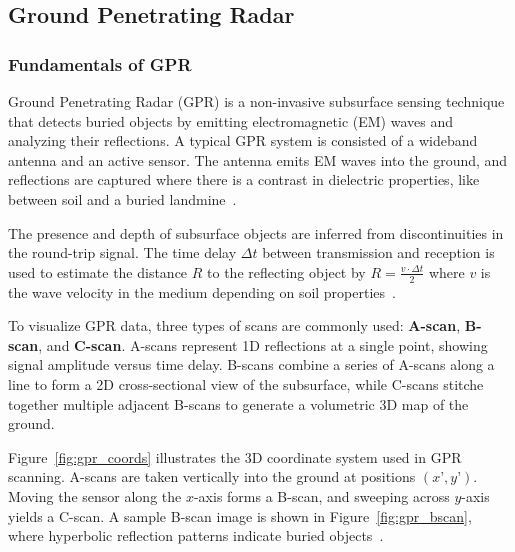 \subsection{Ground Penetrating Radar}

\subsubsection{Fundamentals of GPR}

Ground Penetrating Radar (GPR) is a non-invasive subsurface sensing technique that detects buried objects by emitting electromagnetic (EM) waves and analyzing their reflections. A typical GPR system is consisted of a wideband antenna and an active sensor. The antenna emits EM waves into the ground, and reflections are captured where there is a contrast in dielectric properties, like between soil and a buried landmine~\cite{paik2002image}.

The presence and depth of subsurface objects are inferred from discontinuities in the round-trip signal. The time delay $\Delta t$ between transmission and reception is used to estimate the distance $R$ to the reflecting object by \( R = \frac{v \cdot \Delta t}{2}\) where $v$ is the wave velocity in the medium depending on soil properties~\cite{paik2002image}.

To visualize GPR data, three types of scans are commonly used: \textbf{A-scan}, \textbf{B-scan}, and \textbf{C-scan}. A-scans represent 1D reflections at a single point, showing signal amplitude versus time delay. B-scans combine a series of A-scans along a line to form a 2D cross-sectional view of the subsurface, while C-scans stitche together multiple adjacent B-scans to generate a volumetric 3D map of the ground. 

Figure~\ref{fig:gpr_coords} illustrates the 3D coordinate system used in GPR scanning. A-scans are taken vertically into the ground at positions $(x’, y’)$. Moving the sensor along the $x$-axis forms a B-scan, and sweeping across $y$-axis yields a C-scan. A sample B-scan image is shown in Figure~\ref{fig:gpr_bscan}, where hyperbolic reflection patterns indicate buried objects~\cite{paik2002image}.

